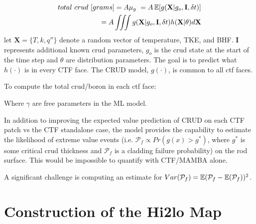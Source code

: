\begin{eqnarray}
        total\ crud\ [grams] = A \mu_g\ = A \operatorname*{\mathbb{E}}[g(\mathbf X|g_o, \mathbf I, \delta t)] \nonumber \\
        = A \iiint g(\mathbf X|g_o, \mathbf I, \delta t) h(\mathbf X|\theta) d \mathbf X
        \label{eq:expected_crud}
\end{eqnarray}
let $\mathbf X= \{T, k, q''\}$ denote a random vector of temperature, TKE, and BHF. $\mathbf I$ represents additional known crud parameters, $g_o$ is the crud state at the start of the time step and $\theta$ are distribution parameters.  The goal is to predict what $h(\cdot)$ is in every CTF face.  The CRUD model, $g(\cdot)$, is common to all ctf faces.

To compute the total crud/boron in each ctf face:
\\

\begin{algorithm}[H]

\end{algorithm}
Where $\gamma$ are free parameters in the ML model.
\bigskip

In addition to improving the expected value prediction of CRUD on each CTF patch vs the CTF standalone case, the model provides the capability to estimate the likelihood of extreme value events (i.e. $\mathcal P_f \propto Pr(g(x) > g^*)$, where $g^*$ is some critical crud thickness and $\mathcal P_f$ is a cladding failure probability) on the rod surface.  This would be impossible to quantify with CTF/MAMBA alone.

A significant challenge is computing an estimate for $Var(\mathcal P_f) = \operatorname*{\mathbb{E}}(\mathcal P_f - \operatorname*{\mathbb{E}}(\mathcal P_f))^2$.


\section{Construction of the Hi2lo Map}

